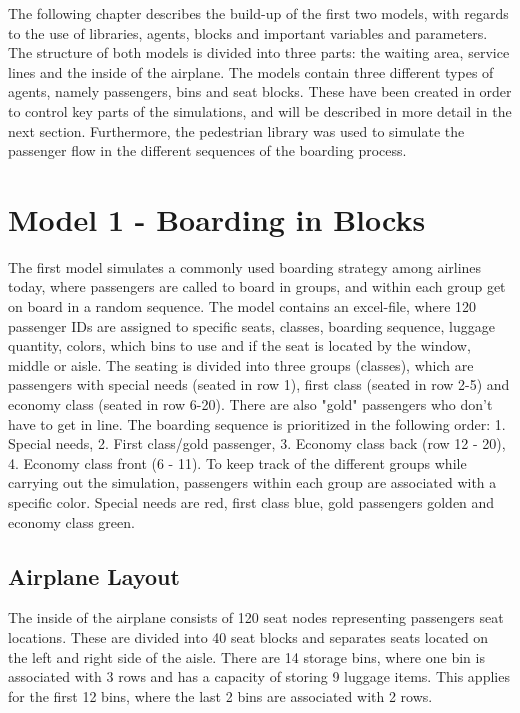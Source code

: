 The following chapter describes the build-up of the first two models, with regards to the use of libraries, agents, blocks and important variables and parameters. The structure of both models is divided into three parts: the waiting area, service lines and the inside of the airplane. The models contain three different types of agents, namely passengers, bins and seat blocks. These have been created in order to control key parts of the simulations, and will be described in more detail in the next section. Furthermore, the pedestrian library was used to simulate the passenger flow in the different sequences of the boarding process. 

\section{Model 1 - Boarding in Blocks}
The first model simulates a commonly used boarding strategy among airlines today, where passengers are called to board in groups, and within each group get on board in a random sequence. The model contains an excel-file, where 120 passenger IDs are assigned to specific seats, classes, boarding sequence, luggage quantity, colors, which bins to use and if the seat is located by the window, middle or aisle. The seating is divided into three groups (classes), which are passengers with special needs (seated in row 1), first class (seated in row 2-5) and economy class (seated in row 6-20). There are also "gold" passengers who don't have to get in line. The boarding sequence is prioritized in the following order: 1. Special needs, 2. First class/gold passenger, 3. Economy class back (row 12 - 20), 4. Economy class front (6 - 11). To keep track of the different groups while carrying out the simulation, passengers within each group are associated with a specific color. Special needs are red, first class blue, gold passengers golden and economy class green. 

\subsection{Airplane Layout}
The inside of the airplane consists of 120 seat nodes representing passengers seat locations. These are divided into 40 seat blocks and separates seats located on the left and right side of the aisle. There are 14 storage bins, where one bin is associated with 3 rows and has  a capacity of storing 9 luggage items. This applies for the first 12 bins, where the last 2 bins are associated with 2 rows.

